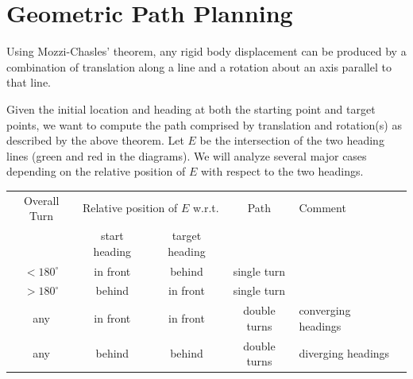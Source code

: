 \documentclass{article}
\newcommand{\Wheel}[3]{
  \begin{scope}[shift={#1},rotate=#2]
    \draw[rounded corners=9,#3] (-1,-5) rectangle (1,5);
  \end{scope}
}
\begin{document}
\bigskip
{}


\section*{Geometric Path Planning}

Using Mozzi-Chasles' theorem, any rigid body displacement can be produced by a combination of
translation along a line and a rotation about an axis parallel to that line.

Given the initial location and heading at both the starting point and target points,
we want to compute the path comprised by translation and rotation(s) as described by 
the above theorem.
Let $E$ be the intersection of the two heading lines (green and red in the diagrams).
We will analyze several major cases depending on the relative position of $E$
with respect to the two headings.


\begin{table}
  \begin{tabular}{ccccll}
    \toprule
    Overall Turn  & \multicolumn{2}{c}{Relative position of $E$ w.r.t.} & Path           & Comment                            \\
                  & start heading                                       & target heading &                                    \\
    \midrule
    $< 180^\circ$ & in front                                            & behind         & single turn                        \\
    $> 180^\circ$ & behind                                              & in front       & single turn                        \\
    any           & in front                                            & in front       & double turns & converging headings \\
    any           & behind                                              & behind         & double turns & diverging headings  \\
    \bottomrule
  \end{tabular}
\end{table}
\end{document}

